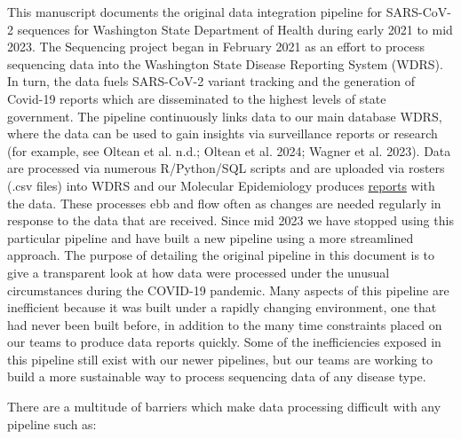 \documentclass[
  letterpaper,
  DIV=11,
  numbers=noendperiod]{scrartcl}
\begin{document}
This manuscript documents the original data integration pipeline for
SARS-CoV-2 sequences for Washington State Department of Health during
early 2021 to mid 2023. The Sequencing project began in February 2021 as
an effort to process sequencing data into the Washington State Disease
Reporting System (WDRS). In turn, the data fuels SARS-CoV-2 variant
tracking and the generation of Covid-19 reports which are disseminated
to the highest levels of state government. The pipeline continuously
links data to our main database WDRS, where the data can be used to gain
insights via surveillance reports or research (for example, see Oltean
et al. n.d.; Oltean et al. 2024; Wagner et al. 2023). Data are processed
via numerous R/Python/SQL scripts and are uploaded via rosters (.csv
files) into WDRS and our Molecular Epidemiology produces
\href{https://doh.wa.gov/sites/default/files/2022-02/420-316-SequencingAndVariantsReport.pdf}{reports}
with the data. These processes ebb and flow often as changes are needed
regularly in response to the data that are received. Since mid 2023 we
have stopped using this particular pipeline and have built a new
pipeline using a more streamlined approach. The purpose of detailing the
original pipeline in this document is to give a transparent look at how
data were processed under the unusual circumstances during the COVID-19
pandemic. Many aspects of this pipeline are inefficient because it was
built under a rapidly changing environment, one that had never been
built before, in addition to the many time constraints placed on our
teams to produce data reports quickly. Some of the inefficiencies
exposed in this pipeline still exist with our newer pipelines, but our
teams are working to build a more sustainable way to process sequencing
data of any disease type.

There are a multitude of barriers which make data processing difficult
with any pipeline such as:
\end{document}

